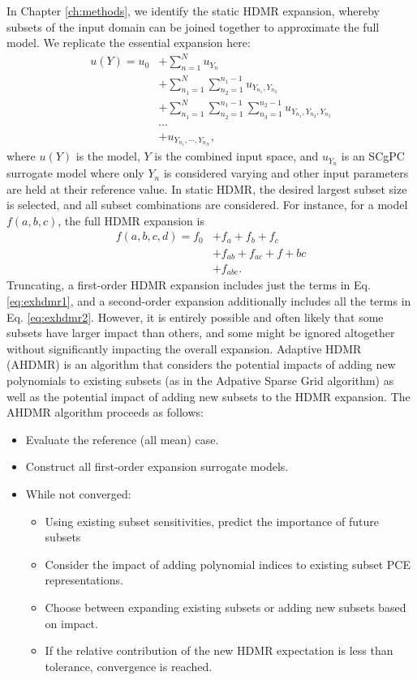 In Chapter \ref{ch:methods}, we identify the static HDMR expansion, whereby subsets of the input domain can be
joined together to approximate the full model.  We replicate the essential expansion here:
\begin{align}
  u(Y) = u_0 &+ \sum_{n=1}^N u_{Y_n} \nonumber\\
  &+ \sum_{n_1=1}^N \sum_{n_2=1}^{n_1-1} u_{Y_{n_1},Y_{n_2}} \nonumber \\
  &+ \sum_{n_1=1}^N \sum_{n_2=1}^{n_1-1} \sum_{n_3=1}^{n_2-1} u_{Y_{n_1},Y_{n_2},Y_{n_3}} \nonumber \\
  &\cdots \nonumber\\
  &+u_{Y_{n_1},\cdots,Y_{n_N}},
\end{align}
where $u(Y)$ is the model, $Y$ is the combined input space, and $u_{Y_n}$ is an SCgPC surrogate model where
only $Y_n$ is considered varying and other input parameters are held at their reference value.  In static
HDMR, the desired largest subset size is selected, and all subset combinations are considered.  For instance,
for a model $f(a,b,c)$, the full HDMR expansion is
\begin{align}
  f(a,b,c,d) = f_0 &+ f_a + f_b + f_c \label{eq:exhdmr1}\\
    &+ f_{ab} + f_{ac} + f+{bc} \label{eq:exhdmr2}\\
    &+ f_{abc}. \label{eq:exhdmr3}
\end{align}
Truncating, a first-order HDMR expansion includes just the terms in Eq. \ref{eq:exhdmr1}, and a second-order
expansion additionally includes all the terms in Eq. \ref{eq:exhdmr2}.  However, it is entirely possible and
often likely that
some subsets have larger impact than others, and some might be ignored altogether without significantly
impacting the overall expansion.  Adaptive HDMR (AHDMR) is an algorithm that considers the potential impacts
of adding new polynomials to existing subsets (as in the Adpative Sparse Grid algorithm) as well as the
potential impact of adding new subsets to the HDMR expansion. The AHDMR algorithm proceeds as follows:
\begin{itemize}
  \item Evaluate the reference (all mean) case.
  \item Construct all first-order expansion surrogate models.
  \item While not converged:
  \begin{itemize}
    \item Using existing subset sensitivities, predict the importance of future subsets
    \item Consider the impact of adding polynomial indices to existing subset PCE representations.
    \item Choose between expanding existing subsets or adding new subsets based on impact.
    \item If the relative contribution of the new HDMR expectation is less than tolerance, convergence is reached.
  \end{itemize}
\end{itemize}
